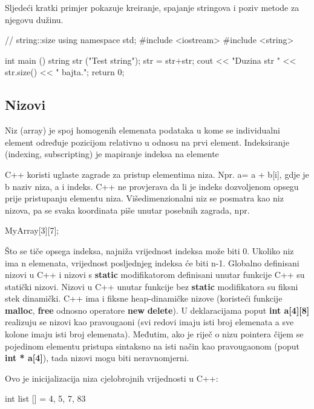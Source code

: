 \documentclass[11pt]{book}
\begin{document}
Sljedeći kratki primjer pokazuje kreiranje, spajanje stringova i poziv metode za njegovu dužinu.

\begin{shortlisting}
  // string::size
  using namespace std;
  #include <iostream>
  #include <string>

  int main ()
    {
      string str ("Test string");
      str = str+str;
      cout << "Duzina str " << str.size() << " bajta.\n";
      return 0;
    }
\end{shortlisting}

\subsection{Nizovi}
Niz (array) je spoj homogenih elemenata podataka u kome se individualni element određuje pozicijom relativno u odnosu na prvi element. Indeksiranje (indexing, subscripting) je mapiranje indeksa na elemente

C++ koristi uglaste zagrade za pristup elementima niza. Npr. a= a + b[i], gdje je b naziv niza, a i indeks. C++ ne provjerava da li je indeks dozvoljenom opsegu prije pristupanju elementu niza.  Višedimenzionalni  niz  se  posmatra  kao  niz  nizova,  pa  se  svaka  koordinata  piše  unutar posebnih zagrada, npr.

\begin{shortlisting}
  MyArray[3][7];
\end{shortlisting}

Što  se  tiče  opsega  indeksa,  najniža  vrijednost  indeksa  može  biti  0.  Ukoliko  niz  ima  n elemenata, vrijednost posljednjeg indeksa će biti n-1.  Globalno definisani nizovi u C++ i nizovi s \textbf{static} modifikatorom definisani unutar funkcije C++ su statički nizovi. Nizovi u C++ unutar funkcije bez \textbf{static} modifikatora su fiksni stek dinamički. C++ ima i fiksne heap-dinamičke nizove (koristeći funkcije \textbf{malloc}, \textbf{free} odnosno operatore \textbf{new} \textbf{delete}). U deklaracijama poput \textbf{int a[4][8]} realizuju se nizovi kao pravougaoni (svi redovi imaju isti broj elemenata a sve kolone imaju isti broj elemenata). Međutim, ako je riječ o nizu pointera čijem se pojedinom elementu pristupa sintaksno na isti način kao pravougaonom (poput \textbf{int * a[4]}), tada nizovi mogu biti neravnomjerni.

Ovo je inicijalizacija niza cjelobrojnih vrijednosti u C++:

\begin{shortlisting}
  int list [] = {4, 5, 7, 83}
\end{shortlisting}
\end{document}
